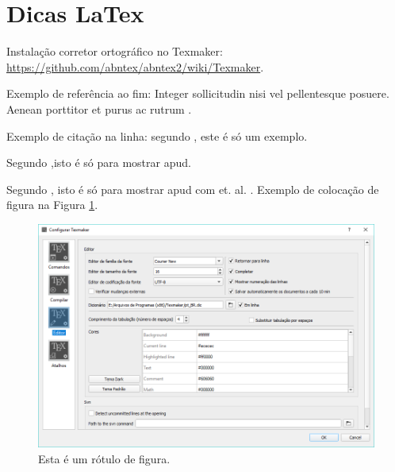\documentclass[
	article,			%
	11pt,				%
	oneside,			%
	a4paper,			%
	chapter=TITLE,		%
	section=TITLE,		%
	subsection=TITLE,	%
	subsubsection=TITLE, %
	english,			%
	brazil,				%
	sumario=tradicional
	]{ifrs-farr-artigo-abntex2}
\begin{document}
\textual


\section{Dicas LaTex}

Instalação corretor ortográfico no Texmaker:
\url{https://github.com/abntex/abntex2/wiki/Texmaker}.

Exemplo de referência ao fim: Integer sollicitudin nisi vel pellentesque posuere. Aenean porttitor et purus ac rutrum \cite{pribeream2013}.

Exemplo de citação na linha: segundo , este é só um exemplo.

Segundo ,isto é só para mostrar apud.

Segundo , isto é só para mostrar apud com et. al. .
\newpage
Exemplo de colocação de figura na Figura \ref{fig_config_edit}.

\begin{figure}[htb]
	\caption{\label{fig_config_edit}Esta é um rótulo de figura.}
	\begin{center}
	    \includegraphics[scale=0.4]{figuras/config_editor_texmaker.png}
	\end{center}
\end{figure}
\end{document}
